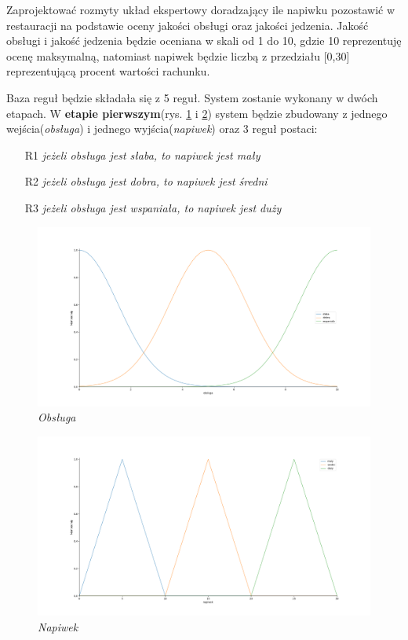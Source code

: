 \documentclass[a4paper, 10pt]{article}
\begin{document}
Zaprojektować rozmyty układ ekspertowy doradzający ile napiwku pozostawić w restauracji na podstawie oceny jakości obsługi oraz jakości jedzenia. Jakość obsługi i jakość jedzenia będzie oceniana w skali od 1 do 10, gdzie 10 reprezentuję ocenę maksymalną, natomiast napiwek będzie liczbą z przedziału [0,30] reprezentującą procent wartości rachunku.

Baza reguł będzie składała się z 5 reguł. System zostanie wykonany w dwóch etapach. W \textbf{etapie pierwszym}(rys. \ref{fig:obsluga} i \ref{fig:napiwek}) system będzie zbudowany z jednego wejścia(\emph{obsługa}) i jednego wyjścia(\emph{napiwek}) oraz 3 reguł postaci:
\begin{itemize}
	\item[R1] \emph{jeżeli obsługa jest słaba, to napiwek jest mały}
	\item[R2] \emph{jeżeli obsługa jest dobra, to napiwek jest średni}
	\item[R3] \emph{jeżeli obsługa jest wspaniała, to napiwek jest duży}
\end{itemize}

\begin{figure}[H]
	\centering
	\includegraphics[scale=0.25]{Figure_1.png}
	\caption{\textit{Obsługa}}
	\label{fig:obsluga}
\end{figure}

\begin{figure}[H]
	\centering
	\includegraphics[scale=0.25]{Figure_2.png}
	\caption{\textit{Napiwek}}
	\label{fig:napiwek}
\end{figure}
\end{document}

